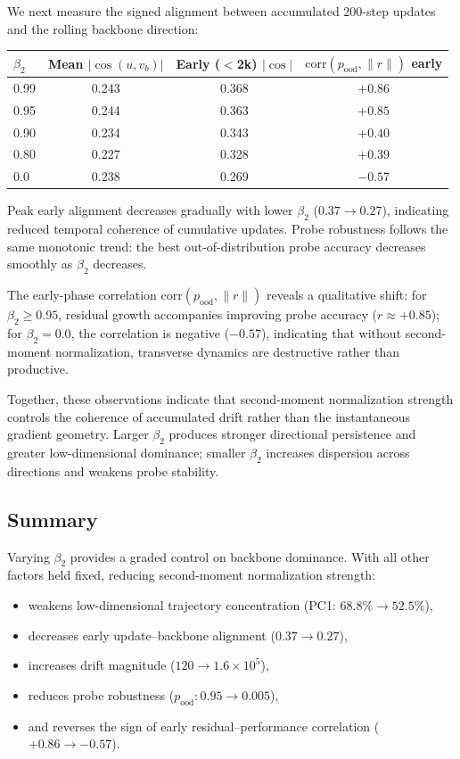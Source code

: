 \documentclass[11pt,a4paper]{article}
\begin{document}
We next measure the signed alignment between accumulated 200-step updates and
the rolling backbone direction:

\begin{center}
\begin{tabular}{lccc}
\toprule
$\beta_2$ & Mean $|\cos(u, v_b)|$ & Early ($<$2k) $|\cos|$
    & $\mathrm{corr}(p_{\mathrm{ood}}, \|r\|)$ early \\
\midrule
0.99 & 0.243 & 0.368 & $+0.86$ \\
0.95 & 0.244 & 0.363 & $+0.85$ \\
0.90 & 0.234 & 0.343 & $+0.40$ \\
0.80 & 0.227 & 0.328 & $+0.39$ \\
0.0  & 0.238 & 0.269 & $-0.57$ \\
\bottomrule
\end{tabular}
\end{center}

Peak early alignment decreases gradually with lower $\beta_2$ ($0.37 \to
0.27$), indicating reduced temporal coherence of cumulative updates.  Probe
robustness follows the same monotonic trend: the best out-of-distribution probe
accuracy decreases smoothly as $\beta_2$ decreases.

The early-phase correlation $\mathrm{corr}(p_{\mathrm{ood}}, \|r\|)$ reveals a
qualitative shift: for $\beta_2 \ge 0.95$, residual growth accompanies
improving probe accuracy ($r \approx +0.85$); for $\beta_2 = 0.0$, the
correlation is negative ($-0.57$), indicating that without second-moment
normalization, transverse dynamics are destructive rather than productive.

Together, these observations indicate that second-moment normalization strength
controls the coherence of accumulated drift rather than the instantaneous
gradient geometry.  Larger $\beta_2$ produces stronger directional persistence
and greater low-dimensional dominance; smaller $\beta_2$ increases dispersion
across directions and weakens probe stability.


\subsection{Summary}

Varying $\beta_2$ provides a graded control on backbone dominance.  With all
other factors held fixed, reducing second-moment normalization strength:

\begin{itemize}
\item weakens low-dimensional trajectory concentration
      (PC1: $68.8\% \to 52.5\%$),
\item decreases early update--backbone alignment ($0.37 \to 0.27$),
\item increases drift magnitude ($120 \to 1.6 \times 10^5$),
\item reduces probe robustness
      ($p_{\mathrm{ood}}: 0.95 \to 0.005$),
\item and reverses the sign of early residual--performance correlation
      ($+0.86 \to -0.57$).
\end{itemize}
\end{document}
